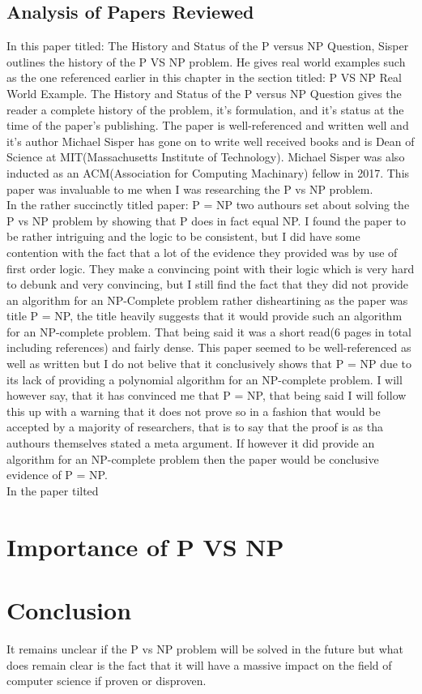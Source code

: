 \documentclass{report}
\begin{document}
\section{Analysis of Papers Reviewed}
In this paper titled: The History and Status of the P versus NP Question\cite{HistoryOfPVsNP}, Sisper outlines the history of the P VS NP problem.  He gives real world examples such as the one referenced earlier in this chapter in the section titled: P VS NP Real World Example.  The History and Status of the P versus NP Question gives the reader a complete history of the problem, it's formulation, and it's status at the time of the paper's publishing.  The paper is well-referenced and written well and it's author Michael Sisper has gone on to write well received books\cite{} and is Dean of Science at MIT(Massachusetts Institute of Technology)\cite{}.  Michael Sisper was also inducted as an ACM(Association for Computing Machinary) fellow in 2017\cite{}. This paper was invaluable to me when I was researching the P vs NP problem.
\\
In the rather succinctly titled paper: P = NP\cite{PVsNPSolved} two authours set about solving the P vs NP problem by showing that P does in fact equal NP.  I found the paper to be rather intriguing and the logic to be consistent, but I did have some contention with the fact that a lot of the evidence they provided was by use of first order logic.  They make a convincing point with their logic which is very hard to debunk and very convincing, but I still find the fact that they did not provide an algorithm for an NP-Complete problem rather disheartining as the paper was title P = NP, the title heavily suggests that it would provide such an algorithm for an NP-complete problem.  That being said it was a short read(6 pages in total including references) and fairly dense.  This paper seemed to be well-referenced as well as written but I do not belive that it conclusively shows that P = NP due to its lack of providing a polynomial algorithm for an NP-complete problem.  I will however say, that it has convinced me that P = NP, that being said I will follow this up with a warning that it does not prove so in a fashion that would be accepted by a majority of researchers, that is to say that the proof is as tha authours themselves stated a meta argument.  If however it did provide an algorithm for an NP-complete problem then the paper would be conclusive evidence of P = NP.
\\
In the paper tilted
\chapter{Importance of P VS NP}
\chapter{Conclusion}
It remains unclear if the P vs NP problem will be solved in the future but what does remain clear is the fact that it will have a massive impact on the field of computer science if proven or disproven.


\end{document}
